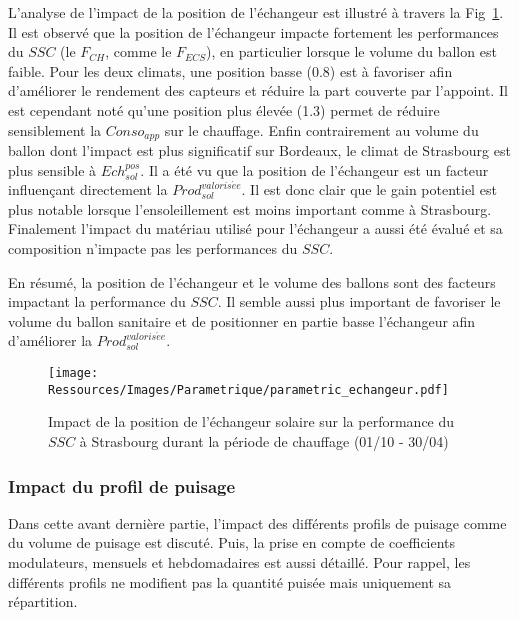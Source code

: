 L’analyse de l’impact de la position de l’échangeur est illustré à travers la
Fig~\ref{fig:impact_pos_ech}. Il est observé que la position de l’échangeur impacte
fortement les performances du $SSC$ (le $F_{CH}$, comme le $F_{ECS}$), en particulier
lorsque le volume du ballon est faible. Pour les deux climats, une position basse
(\num{0.8}) est à favoriser afin d’améliorer le rendement des capteurs et réduire la part
couverte par l’appoint. Il est cependant noté qu’une position plus élevée (\num{1.3})
permet de réduire sensiblement la $Conso_{app}$ sur le chauffage.
Enfin contrairement au volume du ballon dont l’impact est plus significatif sur Bordeaux, le
climat de Strasbourg est plus sensible à $Ech_{sol}^{pos}$. Il a été vu que la position de l’échangeur
est un facteur influençant directement la $Prod_{sol}^{valoris\acute ee}$. Il est donc clair que le gain potentiel
est plus notable lorsque l’ensoleillement est moins important comme à Strasbourg.
Finalement l’impact du matériau utilisé pour l’échangeur a aussi été évalué et sa
composition n’impacte pas les performances du $SSC$.

En résumé, la position de l’échangeur et le volume des ballons sont des facteurs
impactant la performance du $SSC$. Il semble aussi plus important de favoriser
le volume du ballon sanitaire et de positionner en partie basse l’échangeur afin
d’améliorer la $Prod_{sol}^{valoris\acute ee}$.

\begin{figure}
    \begin{center}
        \texttt{[image: Ressources/Images/Parametrique/parametric\_echangeur.pdf]}
    \end{center}
    \caption{Impact de la position de l’échangeur solaire sur la performance
             du $SSC$ à Strasbourg durant la période de chauffage (01/10 - 30/04)
             \label{fig:impact_pos_ech}}
\end{figure}


\subsubsection{Impact du profil de puisage} %
\label{ssub:impact_du_profil_de_puisage}
Dans cette avant dernière partie, l’impact des différents profils de puisage comme du
volume de puisage est discuté. Puis, la prise en compte de coefficients modulateurs,
mensuels et hebdomadaires est aussi détaillé. Pour rappel, les différents profils ne
modifient pas la quantité puisée mais uniquement sa répartition.

